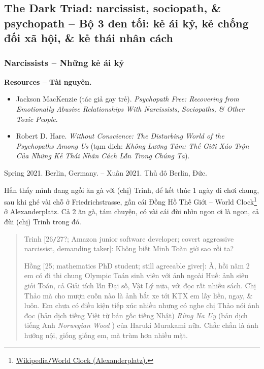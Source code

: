 \documentclass[12pt]{article}
\begin{document}
\subsection{The Dark Triad: narcissist, sociopath, \& psychopath -- Bộ 3 đen tối: kẻ ái kỷ, kẻ chống đối xã hội, \& kẻ thái nhân cách}

\subsubsection{Narcissists -- Những kẻ ái kỷ}
\textbf{\textsf{Resources -- Tài nguyên.}}
\begin{itemize}
	\item \cite{MacKenzie2015} {\sc Jackson MacKenzie} (tác giả gay trẻ). {\it Psychopath Free: Recovering from Emotionally Abusive Relationships With Narcissists, Sociopaths, \& Other Toxic People}.
	\item \cite{Hare1999} {\sc Robert D. Hare}. {\it Without Conscience: The Disturbing World of the Psychopaths Among Us} (tạm dịch: {\it Không Lương Tâm: Thế Giới Xáo Trộn Của Những Kẻ Thái Nhân Cách Lẫn Trong Chúng Ta}).
\end{itemize}
\begin{flushright}
	Spring 2021. Berlin, Germany. -- Xuân 2021. Thủ đô Berlin, Đức.
\end{flushright}
Hắn thấy mình đang ngồi ăn gà với (chị) Trinh, để kết thúc 1 ngày đi chơi chung, sau khi ghé vài chỗ ở Friedrichstrasse, gần cái Đồng Hồ Thế Giới -- World Clock\footnote{\href{https://en.wikipedia.org/wiki/World_Clock_(Alexanderplatz)}{Wikipedia{\tt/}World Clock (Alexanderplatz).}} ở Alexanderplatz. Cả 2 ăn gà, tám chuyện, có vài cái đùi nhìn ngon ơi là ngon, cả đùi (chị) Trinh trong đó. 
\begin{quotation}
	{\sf Trinh [26{\tt/}27?; Amazon junior software developer; covert aggressive narcissist, demanding taker]}: Không biết Minh Toàn giờ sao rồi ta?
	
	{\sf Hồng [25; mathematics PhD student; still agreeable giver]}: À, hồi năm 2 em có đi thi chung Olympic Toán sinh viên với ảnh ngoài Huế: ảnh siêu giỏi Toán, cả Giải tích lẫn Đại số, Vật Lý nữa, với đọc rất nhiều sách. Chị Thảo mà cho mượn cuốn nào là ảnh bắt xe tới KTX em lấy liền, ngay, \& luôn. Em chưa có điều kiện tiếp xúc nhiều nhưng có nghe chị Thảo nói ảnh đọc (bản dịch tiếng Việt từ bản gốc tiếng Nhật) {\it Rừng Na Uy} \cite{Murakami_rung_Na_Uy} (bản dịch tiếng Anh {\it Norwegian Wood} \cite{Murakami_Norwegian_wood}) của {\sc Haruki Murakami} nữa. Chắc chắn là ảnh hướng nội, giống giống em, mà trùm hơn nhiều mặt.
\end{quotation}
\end{document}
